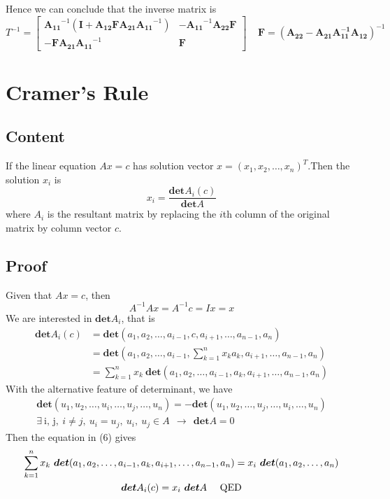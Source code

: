 \documentclass[11pt]{article}
\begin{document}
Hence we can conclude that the inverse matrix is
\begin{equation}
    T^{-1} = \begin{bmatrix}
    \bm{A_{11}}^{-1}(\bm{I} + \bm{A_{12}}\bm{F} \bm{A_{21}}\bm{A_{11}}^{-1}) &  -\bm{A_{11}}^{-1}\bm{A_{22}}\bm{F}  \\
    -\bm{F}\bm{A_{21}}\bm{A_{11}}^{-1} & \bm{F}
    \end{bmatrix}~~~~~\bm{F} = (\bm{A_{22}} - \bm{A_{21}}\bm{A_{11}^{-1}} \bm{A_{12}})^{-1}
\end{equation}
\section{Cramer's Rule}
\subsection{Content}
If the linear equation $Ax = c$ has solution vector $x = (x_1, x_2,\dots, x_n)^{T}$.Then the solution $x_i$ is
\begin{equation}
    x_i = \frac{\bm{det}A_i(c)}{\bm{det}A}
\end{equation}
where $A_i$ is the resultant matrix by replacing the $i$th column of the original matrix by column vector $c$.
\subsection{Proof}
Given that $Ax = c$, then
\begin{equation}
    A^{-1}Ax = A^{-1}c = Ix = x
\end{equation}
We are interested in $\bm{det}A_i$, that is
\begin{equation}
\begin{aligned}
    \bm{det}A_i(c) &= \bm{det}(a_1, a_2, \dots, a_{i-1}, c, a_{i+1}, \dots, a_{n-1}, a_n)\\
    &= \bm{det}(a_1, a_2, \dots, a_{i-1}, \sum^{n}_{k=1}x_ka_k, a_{i+1}, \dots, a_{n-1}, a_n)\\
    &= \sum_{k=1}^{n} x_k~\bm{det}(a_1,a_2,\dots,a_{i-1},a_k, a_{i+1}, \dots, a_{n-1}, a_n)
\end{aligned}
\end{equation}
With the alternative feature of determinant, we have
\begin{gather}
    \bm{det}(u_1, u_2, \dots, u_i, \dots, u_j, \dots, u_n) = -\bm{det}(u_1, u_2, \dots, u_j, \dots, u_i, \dots, u_n) \\
    \exists~\text{i, j},~i\neq j,~u_i = u_j,~u_i,~u_j \in A~~\rightarrow~~\bm{det}A = 0
\end{gather}
Then the equation in (6) gives
\begin{gather}
    \sum_{k=1}^{n} x_k~\bm{det}(a_1,a_2,\dots,a_{i-1},a_k, a_{i+1}, \dots, a_{n-1}, a_n) = x_i~\bm{det}(a_1, a_2, \dots, a_n) \notag \\
    \bm{det}A_i(c) = x_i~\bm{det}A~~~~\text{QED}
\end{gather}
\end{document}
